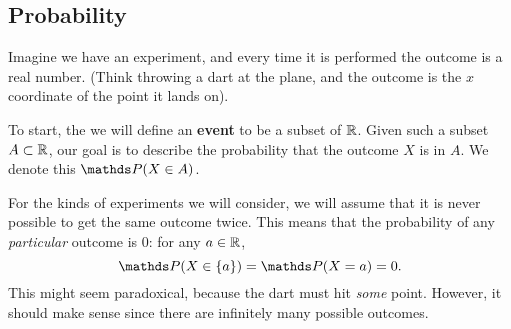 \subsection{Probability}

Imagine we have an experiment, and every time it is performed the outcome is a real number. (Think throwing a dart at the plane, and the outcome is the $x$ coordinate of the point it lands on). 

To start, the we will define an \textbf{event} to be a subset of $\mathbb{R}$. Given such a subset $A\subset\mathbb{R}$, our goal is to describe the probability that the outcome $X$ is in $A$. We denote this $\P(X\in A)$.


For the kinds of experiments we will consider, we will assume that it is never possible to get the same outcome twice. This means that the probability of any \textit{particular} outcome is 0: for any $a\in\mathbb{R}$, $$\P(X\in\{a\})=\P(X=a)=0.$$ 
This might seem paradoxical, because the dart must hit \textit{some} point. However, it should make sense since there are infinitely many possible outcomes.

